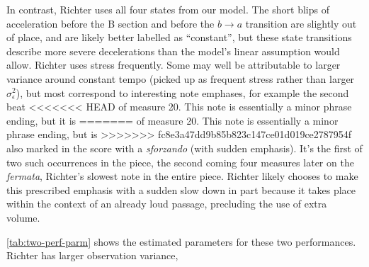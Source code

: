 \documentclass[aoas]{imsart}
\begin{document}
In contrast, Richter uses all four states from our model. The short
blips of acceleration before the B section and before the
$b \rightarrow a$ transition are slightly out of place, and are
likely better labelled as ``constant'', but these state transitions
describe more severe decelerations than the model's linear
assumption would allow. Richter uses stress frequently. Some may well be
attributable to larger variance around constant tempo (picked up as
frequent stress rather than larger $\sigma^2_\epsilon$), but most
correspond to interesting note emphases, for example the second beat
<<<<<<< HEAD
of measure 20. This note is essentially a minor phrase ending, but it is
=======
of measure 20. This note is essentially a minor phrase ending, but is
>>>>>>> fc8e3a47dd9b85b823c147ce01d019ce2787954f
also marked in the score with a {\em sforzando} (with sudden
emphasis). It's the first of two such occurrences in the piece, the
second coming four measures later on the {\em fermata}, Richter's slowest
note in the entire piece. Richter likely chooses to make this
prescribed emphasis with a sudden slow down in part because it takes
place within the context of an already loud passage, precluding the
use of extra volume.
\begin{table}[tb]
  \centering
  \caption{The estimated parameters for performances by Richter and
    Hatto.}
\label{tab:two-perf-parm}
\end{table}
\autoref{tab:two-perf-parm} shows the estimated parameters for these
two performances. Richter has larger observation variance,
\end{document}

